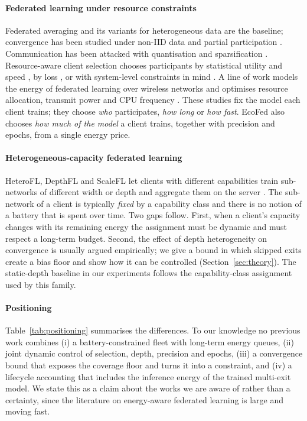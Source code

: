 \paragraph{Federated learning under resource constraints}
Federated averaging \citep{mcmahan2017communication} and its variants for heterogeneous data \citep{li2020fedprox,karimireddy2020scaffold,reddi2021adaptive} are the baseline; convergence has been studied under non-IID data and partial participation \citep{li2020convergence}. Communication has been attacked with quantisation and sparsification \citep{konecny2016federated,alistarh2017qsgd}. Resource-aware client selection chooses participants by statistical utility and speed \citep{lai2021oort}, by loss \citep{cho2020client}, or with system-level constraints in mind \citep{bonawitz2019towards}. A line of work models the energy of federated learning over wireless networks and optimises resource allocation, transmit power and CPU frequency \citep{tran2019federated,yang2021energy}. These studies fix the model each client trains; they choose \emph{who} participates, \emph{how long} or \emph{how fast}. EcoFed also chooses \emph{how much of the model} a client trains, together with precision and epochs, from a single energy price.

\paragraph{Heterogeneous-capacity federated learning}
HeteroFL, DepthFL and ScaleFL let clients with different capabilities train sub-networks of different width or depth and aggregate them on the server \citep{diao2021heterofl,kim2023depthfl,ilhan2023scalefl}. The sub-network of a client is typically \emph{fixed} by a capability class and there is no notion of a battery that is spent over time. Two gaps follow. First, when a client's capacity changes with its remaining energy the assignment must be dynamic and must respect a long-term budget. Second, the effect of depth heterogeneity on convergence is usually argued empirically; we give a bound in which skipped exits create a bias floor and show how it can be controlled (Section~\ref{sec:theory}). The static-depth baseline in our experiments follows the capability-class assignment used by this family.

\paragraph{Positioning}
Table~\ref{tab:positioning} summarises the differences. To our knowledge no previous work combines (i) a battery-constrained fleet with long-term energy queues, (ii) joint dynamic control of selection, depth, precision and epochs, (iii) a convergence bound that exposes the coverage floor and turns it into a constraint, and (iv) a lifecycle accounting that includes the inference energy of the trained multi-exit model. We state this as a claim about the works we are aware of rather than a certainty, since the literature on energy-aware federated learning is large and moving fast.

